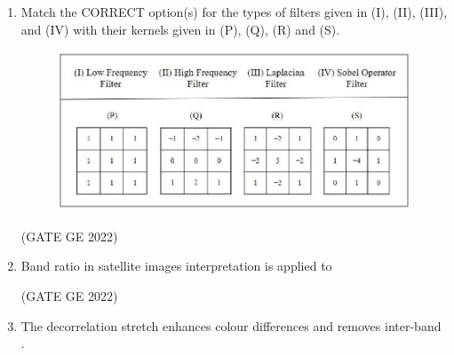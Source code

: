 \documentclass[journal,12pt,onecolumn]{IEEEtran}
\theoremstyle{remark}
\begin{document}
\begin{enumerate}
\item Match the CORRECT option(s) for the types of filters given in (I), (II), (III), and (IV) with their kernels given in (P), (Q), (R) and (S).
\begin{figure}[H]
    \centering
    \includegraphics[width=0.9\columnwidth]{figs/fig_78.png}
    \label{fig:question78}
\end{figure}

\hfill (GATE GE 2022)

\begin{enumerate}
    
\end{enumerate}

\item Band ratio in satellite images interpretation is applied to

\hfill (GATE GE 2022)

\begin{enumerate}
\end{enumerate}

\item The decorrelation stretch enhances colour differences and removes inter-band \makebox[1cm]{\hrulefill}.


\end{enumerate}
\end{document}
